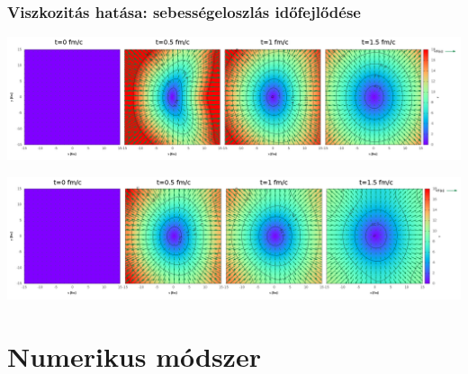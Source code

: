 \documentclass{beamer}
\begin{document}
\begin{frame}[noframenumbering]
\frametitle{Viszkozitás hatása:  sebességeloszlás időfejlődése}
\begin{minipage}{0.04\textwidth}
\end{minipage}
\begin{minipage}{0.95\textwidth}
\begin{center}
    \includegraphics[scale=0.15]{pic/res/nonrel/anim/vv0}

    \includegraphics[scale=0.15]{pic/res/nonrel/anim/vv10}
\end{center}
\end{minipage}
\end{frame}

\section{Numerikus módszer}
\end{document}
